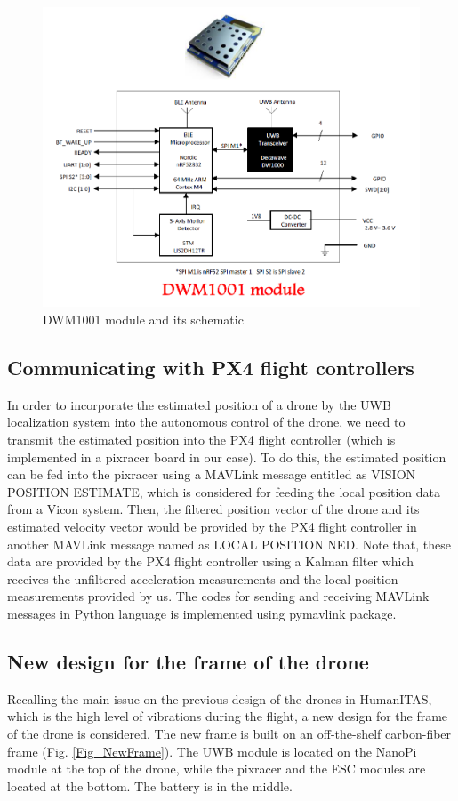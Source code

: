 \documentclass{article}
\begin{document}
\begin{figure}[thpb]
\centering
\includegraphics[scale=0.6]{Pics/DWM1001_Scheme.PNG}
\caption{DWM1001 module and its schematic}
\label{Fig_05}
\end{figure}

\subsection{Communicating with PX4 flight controllers}
In order to incorporate the estimated position of a drone by the UWB localization system into the autonomous control of the drone, we need to transmit the estimated position into the PX4 flight controller (which is implemented in a pixracer board in our case).
To do this, the estimated position can be fed into the pixracer using a MAVLink message entitled as \textsf{VISION POSITION ESTIMATE}, which is considered for feeding the local position data from a Vicon system. 
Then, the filtered position vector of the drone and its estimated velocity vector would be provided by the PX4 flight controller in another MAVLink message named as \textsf{LOCAL POSITION NED}.
Note that, these data are provided by the PX4 flight controller using a Kalman filter which receives the unfiltered acceleration measurements and the local position measurements provided by us. 
The codes for sending and receiving MAVLink messages in Python language is implemented using \textsf{pymavlink} package.

\subsection{New design for the frame of the drone}
Recalling the main issue on the previous design of the drones in HumanITAS, which is the high level of vibrations during the flight, a new design for the frame of the drone is considered. 
The new frame is built on an off-the-shelf carbon-fiber frame (Fig. \ref{Fig_NewFrame}). The UWB module is located on the NanoPi module at the top of the drone, while the pixracer and the ESC modules are located at the bottom. The battery is in the middle.
\end{document}
